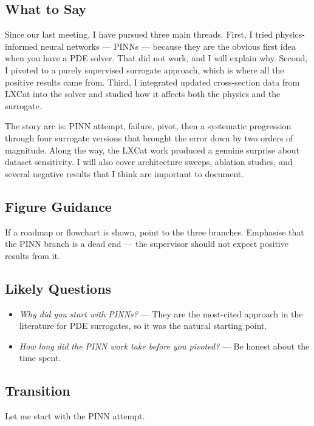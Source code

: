 \documentclass[12pt,a4paper]{article}
\begin{document}
\subsection*{What to Say}

Since our last meeting, I have pursued three main threads. First, I
tried physics-informed neural networks --- PINNs --- because they are
the obvious first idea when you have a PDE solver. That did not work,
and I will explain why. Second, I pivoted to a purely supervised
surrogate approach, which is where all the positive results came from.
Third, I integrated updated cross-section data from LXCat into the
solver and studied how it affects both the physics and the surrogate.

The story arc is: PINN attempt, failure, pivot, then a systematic
progression through four surrogate versions that brought the error
down by two orders of magnitude. Along the way, the LXCat work
produced a genuine surprise about dataset sensitivity. I will also
cover architecture sweeps, ablation studies, and several negative
results that I think are important to document.

\subsection*{Figure Guidance}
If a roadmap or flowchart is shown, point to the three branches.
Emphasise that the PINN branch is a dead end --- the supervisor
should not expect positive results from it.

\subsection*{Likely Questions}
\begin{itemize}
  \item \emph{Why did you start with PINNs?}
    --- They are the most-cited approach in the literature for
    PDE surrogates, so it was the natural starting point.
  \item \emph{How long did the PINN work take before you pivoted?}
    --- Be honest about the time spent.
\end{itemize}

\subsection*{Transition}
Let me start with the PINN attempt.

\clearpage

\end{document}
